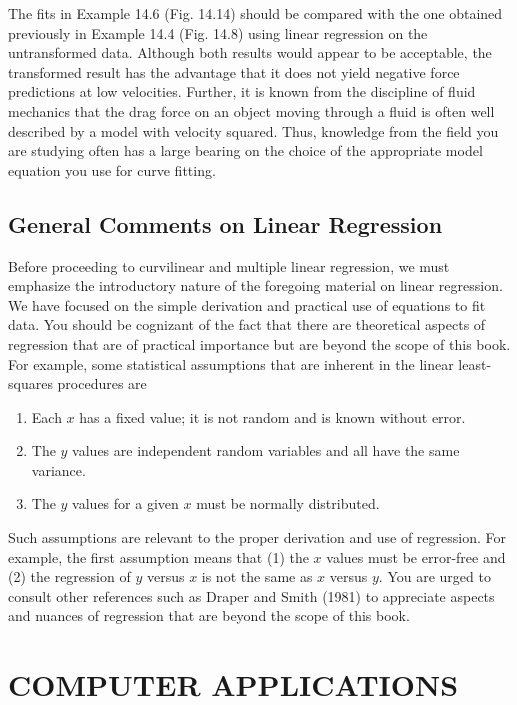 \documentclass[../main.tex]{subfiles}
\begin{document}
The fits in Example 14.6 (Fig. 14.14) should be compared with the one obtained previously in Example 14.4 (Fig. 14.8) using linear regression on the untransformed data. Although both results would appear to be acceptable, the transformed result has the advantage that it does not yield negative force predictions at low velocities. Further, it is known from the discipline of fluid mechanics that the drag force on an object moving through a fluid is often well described by a model with velocity squared. Thus, knowledge from the field you are studying often has a large bearing on the choice of the appropriate model equation you use for curve fitting.


\label{cha:cha_P_14_4_1}
\subsection{General Comments on Linear Regression}

\noindent Before proceeding to curvilinear and multiple linear regression, we must emphasize the introductory nature of the foregoing material on linear regression. We have focused on the simple derivation and practical use of equations to fit data. You should be cognizant of the fact that there are theoretical aspects of regression that are of practical importance but are beyond the scope of this book. For example, some statistical assumptions that are inherent in the linear least-squares procedures are

\begin{enumerate}
	\item Each $x$ has a fixed value; it is not random and is known without error.
	\item The $y$ values are independent random variables and all have the same variance.
	\item The $y$ values for a given $x$ must be normally distributed.
\end{enumerate}

Such assumptions are relevant to the proper derivation and use of regression. For example, the first assumption means that (1) the $x$ values must be error-free and (2) the regression of $y$ versus $x$ is not the same as $x$ versus $y$. You are urged to consult other references such as Draper and Smith (1981) to appreciate aspects and nuances of regression that are beyond the scope of this book.

\label{cha:cha_P_14_5}
\section{COMPUTER APPLICATIONS}
\end{document}
